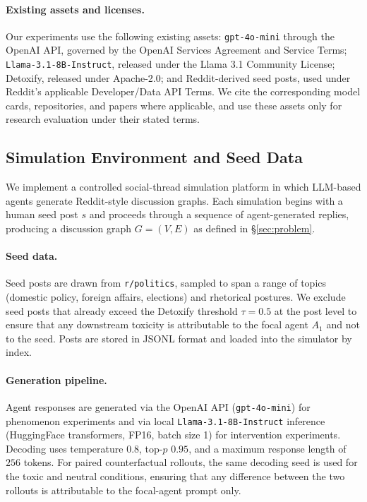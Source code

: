 \paragraph{Existing assets and licenses.}
Our experiments use the following existing assets: \texttt{gpt-4o-mini} through the OpenAI API, governed by the OpenAI Services Agreement and Service Terms; \texttt{Llama-3.1-8B-Instruct}, released under the Llama 3.1 Community License; Detoxify, released under Apache-2.0; and Reddit-derived seed posts, used under Reddit's applicable Developer/Data API Terms. We cite the corresponding model cards, repositories, and papers where applicable, and use these assets only for research evaluation under their stated terms.

\subsection{Simulation Environment and Seed Data}
\label{app:simulation}

We implement a controlled social-thread simulation platform in which LLM-based agents generate Reddit-style discussion graphs.
Each simulation begins with a human seed post $s$ and proceeds through a sequence of agent-generated replies, producing a discussion graph $G = (V, E)$ as defined in \S\ref{sec:problem}.

\paragraph{Seed data.}
Seed posts are drawn from \texttt{r/politics}, sampled to span a range of topics (domestic policy, foreign affairs, elections) and rhetorical postures.
We exclude seed posts that already exceed the Detoxify threshold $\tau{=}0.5$ at the post level to ensure that any downstream toxicity is attributable to the focal agent $A_1$ and not to the seed.
Posts are stored in JSONL format and loaded into the simulator by index.

\paragraph{Generation pipeline.}
Agent responses are generated via the OpenAI API (\texttt{gpt-4o-mini}) for phenomenon experiments and via local \texttt{Llama-3.1-8B-Instruct} inference (HuggingFace transformers, FP16, batch size 1) for intervention experiments.
Decoding uses temperature $0.8$, top-$p$ $0.95$, and a maximum response length of $256$ tokens.
For paired counterfactual rollouts, the same decoding seed is used for the toxic and neutral conditions, ensuring that any difference between the two rollouts is attributable to the focal-agent prompt only.

